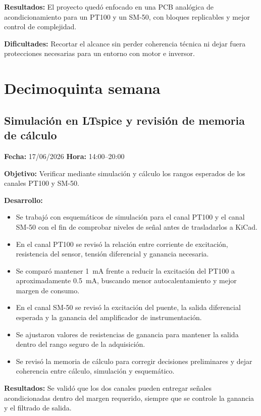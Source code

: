 \documentclass[12pt]{article}
\begin{document}
\textbf{Resultados:}
El proyecto quedó enfocado en una PCB analógica de acondicionamiento para un PT100 y un SM-50, con bloques replicables y mejor control de complejidad.

\textbf{Dificultades:}
Recortar el alcance sin perder coherencia técnica ni dejar fuera protecciones necesarias para un entorno con motor e inversor.

\section{Decimoquinta semana}

\subsection{Simulación en LTspice y revisión de memoria de cálculo}
\textbf{Fecha:} 17/06/2026 \quad \textbf{Hora:} 14:00--20:00

\textbf{Objetivo:}
Verificar mediante simulación y cálculo los rangos esperados de los canales PT100 y SM-50.

\textbf{Desarrollo:}
\begin{itemize}
\item Se trabajó con esquemáticos de simulación para el canal PT100 y el canal SM-50 con el fin de comprobar niveles de señal antes de trasladarlos a KiCad.
\item En el canal PT100 se revisó la relación entre corriente de excitación, resistencia del sensor, tensión diferencial y ganancia necesaria.
\item Se comparó mantener \SI{1}{mA} frente a reducir la excitación del PT100 a aproximadamente \SI{0.5}{mA}, buscando menor autocalentamiento y mejor margen de consumo.
\item En el canal SM-50 se revisó la excitación del puente, la salida diferencial esperada y la ganancia del amplificador de instrumentación.
\item Se ajustaron valores de resistencias de ganancia para mantener la salida dentro del rango seguro de la adquisición.
\item Se revisó la memoria de cálculo para corregir decisiones preliminares y dejar coherencia entre cálculo, simulación y esquemático.
\end{itemize}

\textbf{Resultados:}
Se validó que los dos canales pueden entregar señales acondicionadas dentro del margen requerido, siempre que se controle la ganancia y el filtrado de salida.
\end{document}
